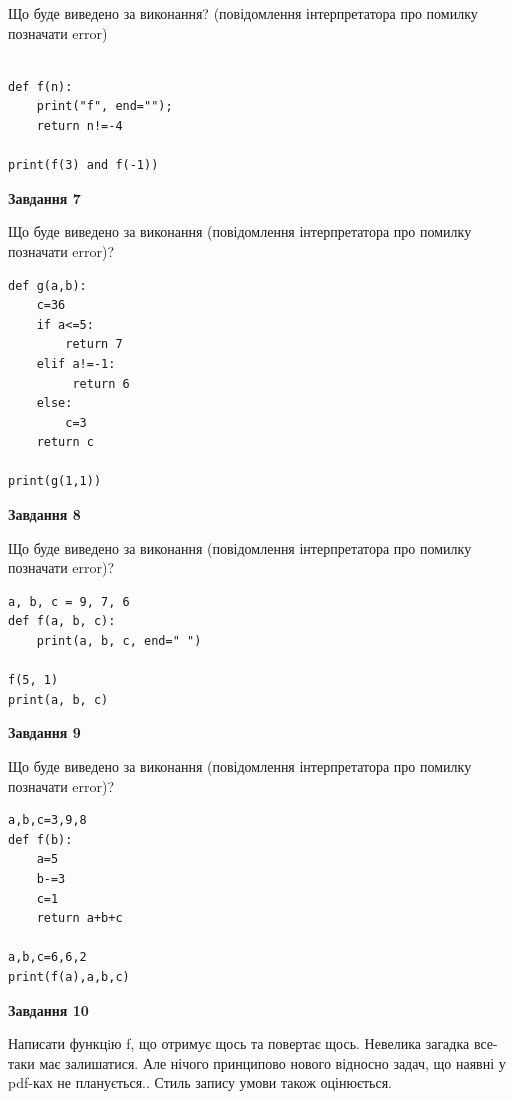 \documentclass[12pt, ukrainian]{article}
\begin{document}
{\begin {large}
Що буде виведено за виконання? (повідомлення інтерпретатора про помилку позначати error)\par
\begin{verbatim}

def f(n):
    print("f", end="");
    return n!=-4

print(f(3) and f(-1))
\end{verbatim}

{\begin {center}\textbf{Завдання 7}\end {center}}

Що буде виведено за виконання (повідомлення інтерпретатора про помилку позначати error)?\par
\begin{verbatim}
def g(a,b):
    c=36
    if a<=5:
        return 7
    elif a!=-1:
         return 6
    else: 
        c=3
    return c

print(g(1,1))
\end{verbatim}

{\begin {center}\textbf{Завдання 8}\end {center}}

Що буде виведено за виконання (повідомлення інтерпретатора про помилку позначати error)?\par
\begin{verbatim}
a, b, c = 9, 7, 6
def f(a, b, c):
    print(a, b, c, end=" ")

f(5, 1)
print(a, b, c)
\end{verbatim}

{\begin {center}\textbf{Завдання 9}\end {center}}

Що буде виведено за виконання (повідомлення інтерпретатора про помилку позначати error)?\par
\begin{verbatim}
a,b,c=3,9,8
def f(b):
    a=5
    b-=3
    c=1
    return a+b+c

a,b,c=6,6,2
print(f(a),a,b,c)
\end{verbatim}

{\begin {center}\textbf{Завдання 10}\end {center}}


Написати функцiю f, що отримує щось та повертає щось. Невелика загадка все-таки має залишатися. Але нічого принципово нового відносно задач, що наявні у pdf-ках не планується.. Стиль запису умови також оцінюється.\par
\end {large}}
\newpage
\end{document}
